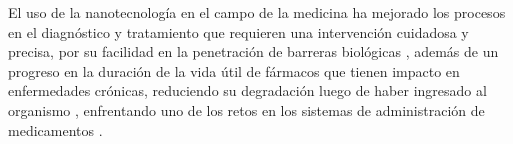 \documentclass[colTwo]{NanouparIEEE}
\begin{document}
        El uso de la nanotecnología en el campo de la medicina ha mejorado los procesos en el diagnóstico y tratamiento que requieren una intervención cuidadosa y precisa, por su facilidad en la penetración de barreras biológicas \cite{01_nano_in_medicine}, además de un progreso en la duración de la vida útil de fármacos que tienen impacto en enfermedades crónicas, reduciendo su degradación luego de haber ingresado al organismo \cite{han2021emerging}\cite{el2020advances}, enfrentando uno de los retos en los sistemas de administración de medicamentos \cite{homayun2019challenges}.

    
    
    
\end{document}
